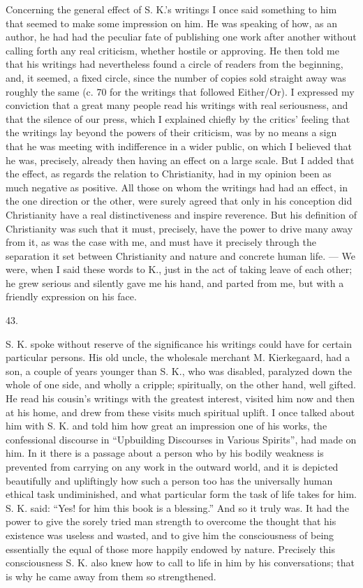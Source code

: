 \documentclass[12pt,a4paper,openany]{book}
\newcommand{\secnum}[1]{\par\begin{center}#1\end{center}\par\nobreak}
\newcommand{\opage}[1]{\marginnote{\footnotesize\textit{[#1]}}}
\begin{document}
Concerning the general effect of S. K.'s writings I once said something to
him that seemed to make some impression on him. He was speaking of how, as an
author, he had had the peculiar fate of publishing one work after another
without calling forth any real criticism, whether hostile or approving. He
then told me that his writings had nevertheless found a circle of readers
from the beginning, and, it seemed, a fixed circle, since the number of
copies sold straight away was roughly the same (c. 70 for the writings that
followed Either/Or). I expressed my conviction that a great many people read
his writings with real seriousness, and that the silence of our press, which
I explained chiefly by the critics' feeling that the writings lay beyond the
powers of their criticism, was by no means a sign that he was meeting with
indifference in a wider public, on which I believed that he was, precisely,
already then having an effect on a large scale. But I added that the effect,
as regards the relation to Christianity, had in my opinion been as much
negative as positive. All those on whom the writings had had an effect, in
the one direction or the other, were surely agreed that only in his
conception did Christianity have a real distinctiveness and inspire
reverence. But his definition of Christianity was such that it must,
precisely, have the power to
\opage{368}drive many away from it, as was the case with me, and must have it
precisely through the separation it set between Christianity and nature and
concrete human life. --- We were, when I said these words to K., just in the
act of taking leave of each other; he grew serious and silently gave me his
hand, and parted from me, but with a friendly expression on his face.

\secnum{43.}

S. K. spoke without reserve of the significance his writings could have for
certain particular persons. His old uncle, the wholesale merchant M.
Kierkegaard, had a son, a couple of years younger than S. K., who was
disabled, paralyzed down the whole of one side, and wholly a cripple;
spiritually, on the other hand, well gifted. He read his cousin's writings
with the greatest interest, visited him now and then at his home, and drew
from these visits much spiritual uplift. I once talked about him with S. K.
and told him how great an impression one of his works, the confessional
discourse in ``Upbuilding Discourses in Various Spirits'', had made on him. In
it there is a passage about a person who by his bodily weakness is prevented
from carrying on any work in the outward world, and it is depicted beautifully
and upliftingly how such a person too has the universally human ethical task
undiminished, and what particular form the task of life takes for him. S. K.
said: ``Yes! for him this book is a blessing.'' And so it truly was. It had
the power to give the sorely tried man strength to overcome the thought that
his existence was useless and wasted, and to give him the consciousness of
being essentially the equal of those more happily endowed by nature. Precisely
this consciousness S. K. also knew how to call to life in him by his
conversations; that is why he came away from them so strengthened.
\end{document}
